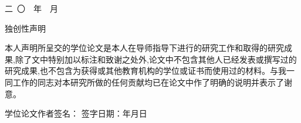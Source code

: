 \documentclass[a4paper, twoside, openright, 12pt]{ctexbook}
\begin{document}
\begin{titlepage}
    \vfill
    
    \begin{center}
        {\songti{} 二\ 〇\ \makebox[1.5cm]{}\ 年\ \makebox[1.5cm]{}\ 月}
    \end{center}
\end{titlepage}
\cleardoublepage

\begin{center}
    {\heiti{} 独创性声明}
\end{center}
\vspace{10pt}
{\songti{} 

本人声明所呈交的学位论文是本人在导师指导下进行的研究工作和取得的研究成果,除了文中特别加以标注和致谢之处外,论文中不包含其他人已经发表或撰写过的研究成果,也不包含为获得\hspace{0.5em}{\heiti 天津工业大学}\hspace{0.5em}或其他教育机构的学位或证书而使用过的材料。与我一同工作的同志对本研究所做的任何贡献均已在论文中作了明确的说明并表示了谢意。

\vspace{40pt}
\begin{flushright}
    学位论文作者签名：\hspace{4cm} 
    签字日期：\hspace{1cm}年\hspace{0.5cm}月\hspace{0.5cm}日\hspace{1cm}
\end{flushright}
}
\cleardoublepage %
\end{document}
